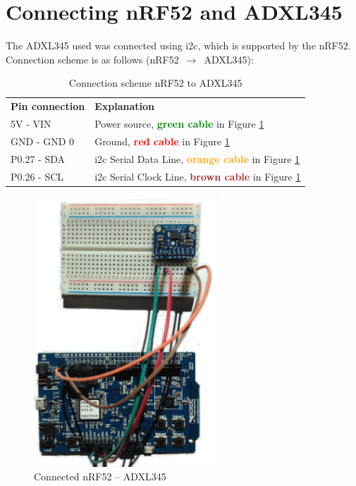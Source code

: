 \section{Connecting nRF52 and ADXL345}

\noindent The \gls{ADXL345} used was connected using \gls{i2c}, which is supported by the \gls{nRF52}. Connection scheme is as follows (\gls{nRF52} $\,\to\,$ \gls{ADXL345}): 

\begin{table}[H]
\centering
\caption{Connection scheme nRF52 to ADXL345}
\label{nRF52ADXL345connection}
\begin{tabular}{ll}
\textbf{Pin connection} & \textbf{Explanation}                                                                                            \\
5V - VIN               & Power source, \textbf{\textcolor{green}{green cable}} in Figure \ref{fig:nrf-adxl345}                   \\
GND - GND           0   & Ground, \textbf{\textcolor{red}{red cable}} in Figure \ref{fig:nrf-adxl345}                             \\
P0.27 - SDA            & \gls{i2c} Serial Data Line, \textbf{\textcolor{orange}{orange cable}} in Figure \ref{fig:nrf-adxl345} \\
P0.26 - SCL            & \gls{i2c} Serial Clock Line, \textbf{\textcolor{brown}{brown cable}} in Figure \ref{fig:nrf-adxl345} 
\end{tabular}
\end{table}


\begin{figure}[ht]
    \centering
    \includegraphics[width=0.62\textwidth]{connectionADXL-nrf5.png}    
    \caption{Connected nRF52 -- ADXL345}
    \label{fig:nrf-adxl345}
\end{figure}

